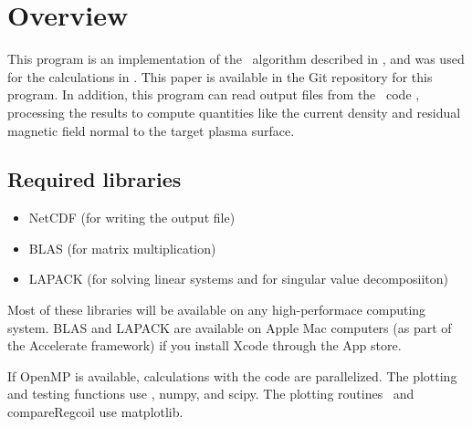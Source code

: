 \chapter{Overview}

This program is an implementation of the \regcoil~algorithm described in \cite{regcoilPaper},
and was used for the calculations in \cite{regcoilPaper}.
This paper is available in the Git repository for this program.
In addition, this program can read output files from the \nescoil~code \cite{nescoil},
processing the results to compute quantities like the current density
and residual magnetic field normal to the target plasma surface.





\section{Required libraries}

\begin{itemize}

\item {\ttfamily NetCDF} (for writing the output file)
\item {\ttfamily BLAS} (for matrix multiplication)
\item {\ttfamily LAPACK} (for solving linear systems and for singular value decomposiiton)

\end{itemize}

Most of these libraries will be available on any high-performace computing system. {\ttfamily BLAS} and {\ttfamily LAPACK}
are available on Apple Mac computers (as part of the Accelerate framework) if you install Xcode through the App store.

If {\ttfamily OpenMP} is available, calculations with the code are parallelized.
The plotting and testing functions use \python,
{\ttfamily numpy}, and {\ttfamily scipy}.
The plotting routines \regcoilPlot~and {\ttfamily compareRegcoil} use {\ttfamily matplotlib}.

